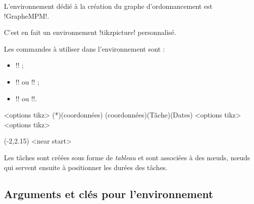 \documentclass[french,a4paper,11pt]{article}
\begin{document}
{{\begin{cautionblock}
L'environnement dédié à la création du graphe d'ordonnancement est \motcletex!GrapheMPM!.

C'est en fait un environnement \motcletex!tikzpicture! personnalisé.

\smallskip

Les commandes à utiliser dans l'environnement sont :

\begin{itemize}
	\item \motcletex!\MPMPlaceNotice! ;
	\item \motcletex!\MPMPlaceTache! ou \motcletex!\MPMPlaceTaches! ;
	\item \motcletex!\MPMPlaceDuree! ou \motcletex!\MPMPlaceDurees!.
\end{itemize}
\vspace*{-\baselineskip}\leavevmode
\end{cautionblock}

\begin{DemoCode}
\begin{GrapheMPM}[clés]<options tikz>
	\MPMPlaceNotice(*)(coordonnées)
	\MPMPlaceTache(coordonnées)(Tâche)(Dates)
	<options tikz>
	<options tikz>
\end{GrapheMPM}
\end{DemoCode}

\begin{DemoCode}[]
\begin{GrapheMPM}
	\MPMPlaceNotice(-2,2.15)
	<near start>
\end{GrapheMPM}
\end{DemoCode}

\begin{tipblock}
Les tâches sont créées sous forme de \textit{tableau} et sont associées à des nœuds, nœuds qui servent ensuite à positionner les durées des tâches.
\end{tipblock}

\pagebreak

\subsection{Arguments et clés pour l'environnement}

}}
\end{document}
